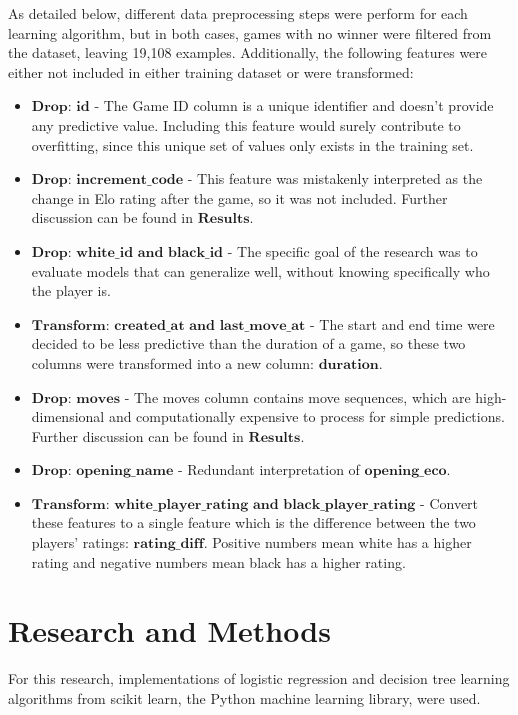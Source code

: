 \documentclass[12pt]{article}
\begin{document}
As detailed below, different data preprocessing steps were perform for each learning algorithm, but in both cases, games with no winner were filtered from the dataset, leaving 19,108 examples. Additionally, the following features were either not included in either training dataset or were transformed:

\begin{itemize}[label={}, leftmargin=0pt]
  \item $\textbf{Drop: id}$ - The Game ID column is a unique identifier and doesn’t provide any predictive value. Including this feature would surely contribute to overfitting, since this unique set of values only exists in the training set.
  \item $\textbf{Drop: increment\_code}$ - This feature was mistakenly interpreted as the change in Elo rating after the game, so it was not included. Further discussion can be found in $\textbf{Results}$.
  \item $\textbf{Drop: white\_id and black\_id}$ - The specific goal of the research was to evaluate models that can generalize well, without knowing specifically who the player is.
  \item $\textbf{Transform: created\_at and last\_move\_at}$ - The start and end time were decided to be less predictive than the duration of a game, so these two columns were transformed into a new column: $\textbf{duration}$.
  \item $\textbf{Drop: moves}$ - The moves column contains move sequences, which are high-dimensional and computationally expensive to process for simple predictions. Further discussion can be found in $\textbf{Results}$.
  \item $\textbf{Drop: opening\_name}$ - Redundant interpretation of $\textbf{opening\_eco}$.
  \item $\textbf{Transform: white\_player\_rating and black\_player\_rating}$ - Convert these features to a single feature which is the difference between the two players' ratings: $\textbf{rating\_diff}$. Positive numbers mean white has a higher rating and negative numbers mean black has a higher rating.
\end{itemize}

\section{Research and Methods}
For this research, implementations of logistic regression and decision tree learning algorithms from scikit learn, the Python machine learning library, were used.
\end{document}
